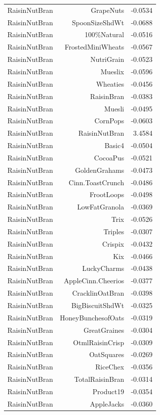 \begin{longtable}{@{}lrr@{}}
RaisinNutBran & GrapeNuts & -0.0534 \\
RaisinNutBran & SpoonSizeShdWt & -0.0688 \\
RaisinNutBran & 100\%Natural & -0.0516 \\
RaisinNutBran & FrostedMiniWheats & -0.0567 \\
RaisinNutBran & NutriGrain & -0.0523 \\
RaisinNutBran & Mueslix & -0.0596 \\
RaisinNutBran & Wheaties & -0.0456 \\
RaisinNutBran & RaisinBran & -0.0383 \\
RaisinNutBran & Muesli & -0.0495 \\
RaisinNutBran & CornPops & -0.0603 \\
RaisinNutBran & RaisinNutBran & 3.4584 \\
RaisinNutBran & Basic4 & -0.0504 \\
RaisinNutBran & CocoaPus & -0.0521 \\
RaisinNutBran & GoldenGrahams & -0.0473 \\
RaisinNutBran & Cinn.ToastCrunch & -0.0486 \\
RaisinNutBran & FrootLoops & -0.0498 \\
RaisinNutBran & LowFatGranola & -0.0369 \\
RaisinNutBran & Trix & -0.0526 \\
RaisinNutBran & Triples & -0.0307 \\
RaisinNutBran & Crispix & -0.0432 \\
RaisinNutBran & Kix & -0.0466 \\
RaisinNutBran & LuckyCharms & -0.0438 \\
RaisinNutBran & AppleCinn.Cheerios & -0.0377 \\
RaisinNutBran & CracklinOatBran & -0.0398 \\
RaisinNutBran & BigBiscuitShdWt & -0.0325 \\
RaisinNutBran & HoneyBunchesofOats & -0.0319 \\
RaisinNutBran & GreatGraines & -0.0304 \\
RaisinNutBran & OtmlRaisinCrisp & -0.0309 \\
RaisinNutBran & OatSquares & -0.0269 \\
RaisinNutBran & RiceChex & -0.0356 \\
RaisinNutBran & TotalRaisinBran & -0.0314 \\
RaisinNutBran & Product19 & -0.0354 \\
RaisinNutBran & AppleJacks & -0.0360 \\

\end{longtable}
